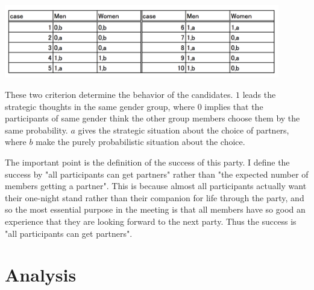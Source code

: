 \documentclass{article}
\begin{document}
\begin{center}
\includegraphics[width = 12cm]{table.png}
\end{center}
\par
These two criterion determine the behavior of the candidates. $1$ leads the strategic thoughts in the same gender group, where $0$ implies that the participants of same gender think the other group members choose them by the same probability. $a$ gives the strategic situation about the choice of partners, where $b$ make the purely probabilistic situation about the choice.
\par
The important point is the definition of the success of this party. I define the success by "all participants can get partners" rather than "the expected number of members getting a partner". This is because almost all participants actually want their one-night stand rather than their companion for life through the party, and so the most essential purpose in the meeting is that all members have so good an experience that they are looking forward to the next party. Thus the success is "all participants can get partners".


\section{Analysis}
\end{document}
